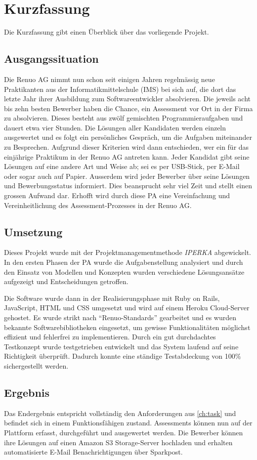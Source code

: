 \chapter{Kurzfassung}

Die Kurzfassung gibt einen Überblick über das vorliegende Projekt.

\section{Ausgangssituation}

Die Renuo AG nimmt nun schon seit einigen Jahren regelmässig neue Praktikanten aus der Informatikmittelschule (IMS) bei sich auf, die
dort das letzte Jahr ihrer Ausbildung zum Softwareentwickler absolvieren. Die jeweils acht bis zehn besten Bewerber haben die Chance, ein Assessment
vor Ort in der Firma zu absolvieren. Dieses besteht aus zwölf gemischten Programmieraufgaben und dauert etwa vier Stunden.
Die Lösungen aller Kandidaten werden einzeln ausgewertet und es folgt ein persönliches Gespräch, um die Aufgaben miteinander zu Besprechen.
Aufgrund dieser Kriterien wird dann entschieden, wer ein für das einjährige Praktikum in der Renuo AG antreten kann.
Jeder Kandidat gibt seine Lösungen auf eine andere Art und Weise ab; sei es per USB-Stick, per E-Mail oder sogar auch auf Papier.
Ausserdem wird jeder Bewerber über seine Lösungen und Bewerbungsstatus informiert.
Dies beansprucht sehr viel Zeit und stellt einen grossen Aufwand dar. Erhofft wird durch diese PA eine Vereinfachung und Vereinheitlichung des Assessment-Prozesses in der Renuo AG.

\section{Umsetzung}

Dieses Projekt wurde mit der Projektmanagementmethode \emph{IPERKA} abgewickelt. In den ersten Phasen der PA wurde die Aufgabenstellung analysiert
und durch den Einsatz von Modellen und Konzepten wurden verschiedene Lösungsansätze aufgezeigt und Entscheidungen getroffen. 

Die Software wurde dann in der Realisierungsphase mit Ruby on Rails, JavaScript, HTML und CSS umgesetzt und wird auf einem Heroku Cloud-Server gehostet.
Es wurde strikt nach \enquote{Renuo-Standards} gearbeitet und es wurden bekannte Softwarebibliotheken eingesetzt,  
um gewisse Funktionalitäten möglichst effizient und fehlerfrei zu implementieren. Durch ein gut durchdachtes Testkonzept wurde testgetrieben entwickelt 
und das System laufend auf seine Richtigkeit überprüft. Dadurch konnte eine ständige Testabdeckung von 100\% sichergestellt werden.

\section{Ergebnis}

Das Endergebnis entspricht vollständig den Anforderungen aus \ref{ch:task} und befindet sich in einem Funktionsfähigen zustand.
Assessments können nun auf der Plattform erfasst, durchgeführt und ausgewertet werden. Die Bewerber können ihre Lösungen auf einen Amazon S3
Storage-Server hochladen und erhalten automatisierte E-Mail Benachrichtigungen über Sparkpost.
